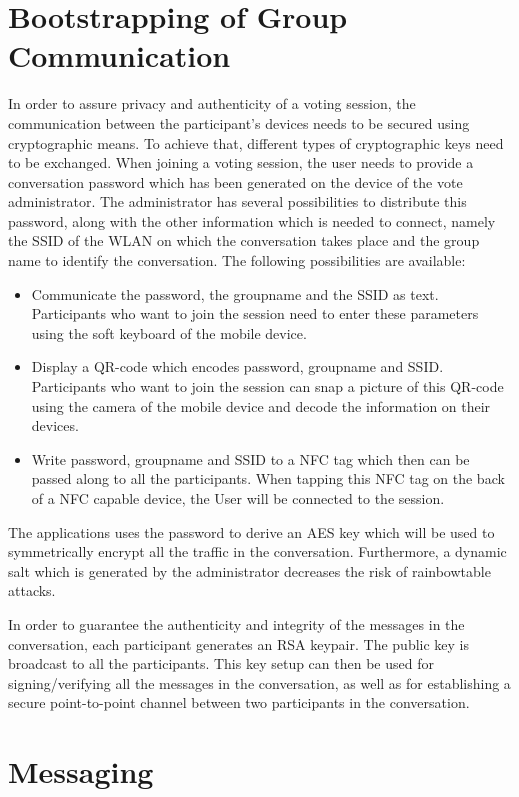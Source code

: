 \documentclass[numbers=noenddot, abstract=on, a4paper, headsepline,
footsepline, oneside, draft=off]{scrreprt}
\begin{document}
\section{Bootstrapping of Group Communication}
\label{sec:bootstraping}
In order to assure privacy and authenticity of a voting session, the
communication between the participant's devices needs to be secured using
cryptographic means. To achieve that, different types of cryptographic keys need
to be exchanged. When joining a voting session, the user needs to provide a
conversation password which has been generated on the device of the vote
administrator. The administrator has several possibilities to distribute this
password, along with the other information which is needed to connect, namely
the SSID of the WLAN on which the conversation takes place and the group name to
identify the conversation. The following possibilities are available:
\begin{itemize}
  \item Communicate the password, the groupname and the SSID as text.
  Participants who want to join the session need to enter these parameters using
  the soft keyboard of the mobile device.
  \item Display a QR-code which encodes password, groupname and SSID.
  Participants who want to join the session can snap a picture of this QR-code
  using the camera of the mobile device and decode the information on their
  devices.
  \item Write password, groupname and SSID to a NFC tag which then can be passed
  along to all the participants. When tapping this NFC tag on the back of a NFC
  capable device, the User will be connected to the session.
\end{itemize}

The applications uses the password to derive an AES key which will be used to
symmetrically encrypt all the traffic in the conversation. Furthermore, a
dynamic salt which is generated by the administrator decreases the risk of
rainbowtable attacks.

In order to guarantee the authenticity and integrity of the messages in the
conversation, each participant generates an RSA keypair. The public key is 
broadcast to all the participants. This key setup can then be used for
signing/verifying all the messages in the conversation, as well as for
establishing a secure point-to-point channel between two participants in the
conversation.

\section{Messaging}
\label{sec:messaging}
\end{document}
